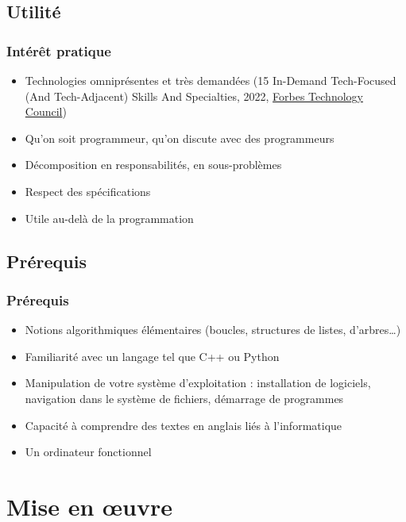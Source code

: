 \documentclass[english, french]{beamer}
\begin{document}
\subsection{Utilité}
\begin{frame}
	\frametitle{Intérêt pratique}
	\begin{itemize}
		\item Technologies omniprésentes et très demandées {\tiny (15 In-Demand Tech-Focused (And Tech-Adjacent) Skills And Specialties, 2022, \href{https://www.forbes.com/sites/forbestechcouncil/2022/07/11/15-in-demand-tech-focused-and-tech-adjacent-skills-and-specialties/?sh=44e82adc38d8}{Forbes Technology Council})}
		\item Qu’on soit programmeur, qu’on discute avec des programmeurs
		\item Décomposition en responsabilités, en sous-problèmes
		\item Respect des spécifications
		\item Utile au-delà de la programmation
	\end{itemize}
\end{frame}

\subsection{Prérequis}
\begin{frame}
	\frametitle{Prérequis}
	\begin{itemize}
		\item Notions algorithmiques élémentaires (boucles, structures de listes, d’arbres…)
		\item Familiarité avec un langage tel que C++ ou Python
		\item Manipulation de votre système d’exploitation : installation de logiciels, navigation dans le système de fichiers, démarrage de programmes
		\item Capacité à comprendre des textes en anglais liés à l’informatique
		\item Un ordinateur fonctionnel
	\end{itemize}
\end{frame}

\section{Mise en œuvre}
\end{document}
